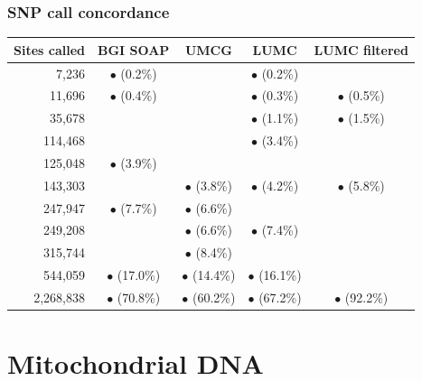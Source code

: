 \documentclass[slidestop,14pt]{beamer}
\begin{document}
\begin{frame}
  \frametitle{SNP call concordance}
  \vspace{-\baselineskip}
\begin{center}
{\footnotesize\renewcommand{\arraystretch}{1.2}
\renewcommand{\tabcolsep}{8pt}
\begin{tabular}{r c c c c}
Sites called & BGI SOAP & UMCG & LUMC & LUMC filtered\\
\hline
7,236 & $\bullet$ (0.2\%) & & $\bullet$ (0.2\%) &\\
11,696 & $\bullet$ (0.4\%) & & $\bullet$ (0.3\%) & $\bullet$ (0.5\%)\\
35,678 & & & $\bullet$ (1.1\%) & $\bullet$ (1.5\%)\\
114,468 & & & $\bullet$ (3.4\%) &\\
125,048 & $\bullet$ (3.9\%) & & &\\
143,303 & & $\bullet$ (3.8\%) & $\bullet$ (4.2\%) & $\bullet$ (5.8\%)\\
247,947 & $\bullet$ (7.7\%) & $\bullet$ (6.6\%) & &\\
249,208 & & $\bullet$ (6.6\%) & $\bullet$ (7.4\%) &\\
315,744 & & $\bullet$ (8.4\%) & &\\
544,059 & $\bullet$ (17.0\%) & $\bullet$ (14.4\%) & $\bullet$ (16.1\%) &\\
2,268,838 & $\bullet$ (70.8\%) & $\bullet$ (60.2\%) & $\bullet$ (67.2\%) & $\bullet$ (92.2\%)
\end{tabular}}
\end{center}
\end{frame}

\section{Mitochondrial DNA}

\end{document}
